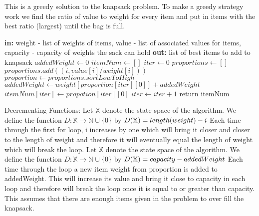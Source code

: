\documentclass{article}
\newcommand{\N}{\mathbb{N}}
\begin{document}
\begin{enumerate}
    This is a greedy solution to the knapsack problem. To make a greedy strategy work we find the ratio of value to weight for every item and put in items with the best ratio (largest) until the bag is full.
    \begin{algorithm}
    \begin{algorithmic}
    \newline
    	\textbf{in: } weight - list of weights of items, value - list of associated values for items, capacity - capacity of weights the sack can hold\newline
	\textbf{out: } list of best items to add to knapsack
	\State $addedWeight \gets 0$
	\State $itemNum \gets []$
	\State $iter \gets 0$
	\State $proportions \gets []$
		\State $proportions.add((i, value[i]/weight[i])) $
	\EndFor
	\State $proportion \gets proportions.sortLowToHigh$
		\State $addedWeight \gets weight[proportion[iter][0]] + addedWeight$
		\State $itemNum[iter] \gets propotion[iter][0]$ 
		\State $iter \gets iter + 1$
	\EndWhile
	\State return itemNum
    \EndProcedure
    \end{algorithmic}
    \end{algorithm}
    \newline
    Decrementing Functions: \newline
     Let $\mathbb{X}$ denote the state space of the algorithm. We define the function $D \colon \mathbb{X} \to \N \cup \{0\}$ by $D( \mathbb{X}) = length(weight) -i\newline $
   Each time through the first for loop, i increases by one which will bring it closer and closer to the length of weight and therefore it will eventually equal the length of weight which will break the loop.
 Let $\mathbb{X}$ denote the state space of the algorithm. We define the function $D \colon \mathbb{X} \to \N \cup \{0\}$ by $D( \mathbb{X}) = capacity - addedWeight\newline $
 Each time through the loop a new item weight from proportion is added to addedWeight. This will increase its value and bring it close to capacity in each loop and therefore will break the loop once it is equal to or greater than capacity. This assumes that there are enough items given in the problem to over fill the knapsack.
 

\end{enumerate}
\end{document}
